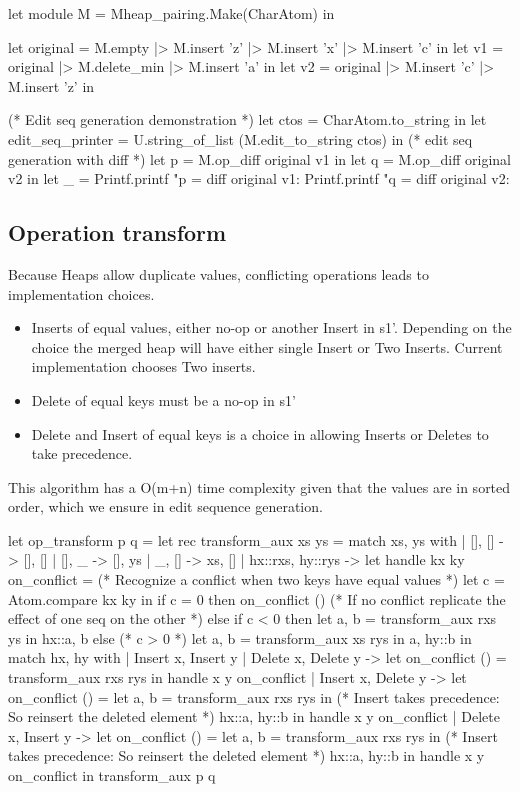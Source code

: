 \documentclass{article}
\begin{document}
\begin{longlisting}
let module M = Mheap_pairing.Make(CharAtom) in

let original = M.empty |> M.insert 'z' |> M.insert 'x' |> M.insert 'c' in
let v1 = original |> M.delete_min |> M.insert 'a' in
let v2 = original |> M.insert 'c' |> M.insert 'z' in

(* Edit seq generation demonstration *)
let ctos = CharAtom.to_string in
let edit_seq_printer = U.string_of_list (M.edit_to_string ctos) in
(* edit seq generation with diff *)
let p = M.op_diff original v1 in
let q = M.op_diff original v2 in
let _ = 
  Printf.printf "p = diff original v1: %
  Printf.printf "q = diff original v2: %
\end{longlisting}

\subsection{Operation transform}
Because Heaps allow duplicate values, conflicting operations leads to implementation choices.
\begin{itemize}
\item Inserts of equal values, either no-op or another Insert in s1'. 
Depending on the choice the merged heap will have either single Insert or Two Inserts. 
Current implementation chooses Two inserts.
\item Delete of equal keys must be a no-op in s1'
\item Delete and Insert of equal keys is a choice in allowing Inserts or Deletes to take precedence.
\end{itemize}
This algorithm has a O(m+n) time complexity given that the values are in sorted order, 
which we ensure in edit sequence generation.

\begin{longlisting}
let op_transform p q = 
  let rec transform_aux xs ys =
    match xs, ys with
    | [], [] -> [], []
    | [], _ -> [], ys
    | _, [] -> xs, []   
    | hx::rxs, hy::rys ->
      let handle kx ky on_conflict =
        (* Recognize a conflict when two keys have equal values *)
        let c = Atom.compare kx ky in
        if c = 0 then on_conflict ()
        (* If no conflict replicate the effect of one seq on the other  *)
        else if c < 0 then 
          let a, b = transform_aux rxs ys in
          hx::a, b
        else (* c > 0 *)
          let a, b = transform_aux xs rys in
          a, hy::b in
      match hx, hy with
      | Insert x, Insert y
      | Delete x, Delete y ->
        let on_conflict () = transform_aux rxs rys in
        handle x y on_conflict
      | Insert x, Delete y ->
        let on_conflict () =
          let a, b = transform_aux rxs rys in
          (* Insert takes precedence: So reinsert the deleted element *)
          hx::a, hy::b in
        handle x y on_conflict
      | Delete x, Insert y ->
        let on_conflict () =
          let a, b = transform_aux rxs rys in
          (* Insert takes precedence: So reinsert the deleted element *)
          hx::a, hy::b in
        handle x y on_conflict
  in
  transform_aux p q
\end{longlisting}
\end{document}

